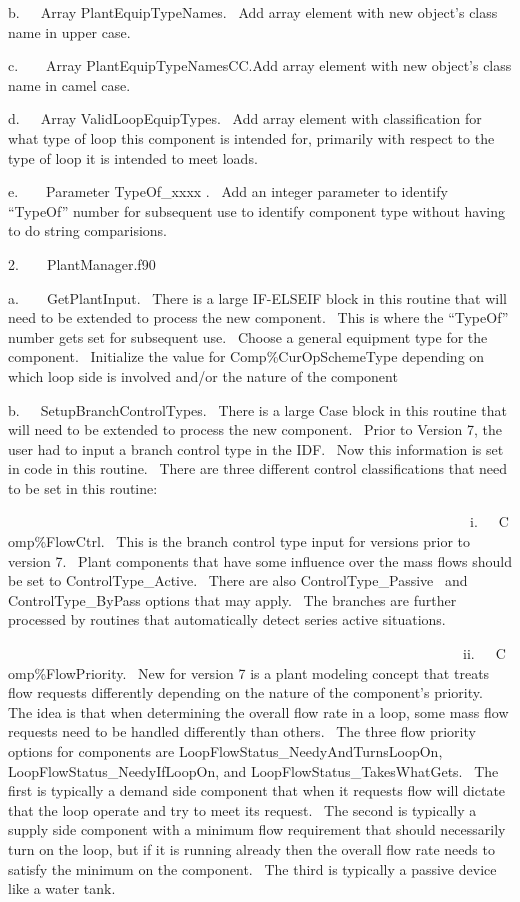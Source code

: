 b.~~~Array PlantEquipTypeNames.~ Add array element with new object's class name in upper case.

c.~~~~Array PlantEquipTypeNamesCC.Add array element with new object's class name in camel case.

d.~~~Array ValidLoopEquipTypes.~ Add array element with classification for what type of loop this component is intended for, primarily with respect to the type of loop it is intended to meet loads.

e.~~~~Parameter TypeOf\_xxxx .~ Add an integer parameter to identify ``TypeOf'' number for subsequent use to identify component type without having to do string comparisions.

2.~~~~PlantManager.f90

a.~~~~GetPlantInput.~ There is a large IF-ELSEIF block in this routine that will need to be extended to process the new component.~ This is where the ``TypeOf'' number gets set for subsequent use.~ Choose a general equipment type for the component.~ Initialize the value for Comp\%CurOpSchemeType depending on which loop side is involved and/or the nature of the component

b.~~~SetupBranchControlTypes.~ There is a large Case block in this routine that will need to be extended to process the new component.~ Prior to Version 7, the user had to input a branch control type in the IDF.~ Now this information is set in code in this routine.~ There are three different control classifications that need to be set in this routine:

~~~~~~~~~~~~~~~~~~~~~~~~~~~~~~~~~~~~~~~~~~~~~~~~~~~~~~~~~~~~~~~~~~i.~~~Comp\%FlowCtrl.~ This is the branch control type input for versions prior to version 7.~ Plant components that have some influence over the mass flows should be set to ControlType\_Active.~ There are also ControlType\_Passive~ and ControlType\_ByPass options that may apply.~ The branches are further processed by routines that automatically detect series active situations.

~~~~~~~~~~~~~~~~~~~~~~~~~~~~~~~~~~~~~~~~~~~~~~~~~~~~~~~~~~~~~~~~~ii.~~~Comp\%FlowPriority.~ New for version 7 is a plant modeling concept that treats flow requests differently depending on the nature of the component's priority.~ The idea is that when determining the overall flow rate in a loop, some mass flow requests need to be handled differently than others.~ The three flow priority options for components are LoopFlowStatus\_NeedyAndTurnsLoopOn, LoopFlowStatus\_NeedyIfLoopOn, and LoopFlowStatus\_TakesWhatGets.~ The first is typically a demand side component that when it requests flow will dictate that the loop operate and try to meet its request.~ The second is typically a supply side component with a minimum flow requirement that should necessarily turn on the loop, but if it is running already then the overall flow rate needs to satisfy the minimum on the component.~ The third is typically a passive device like a water tank.

